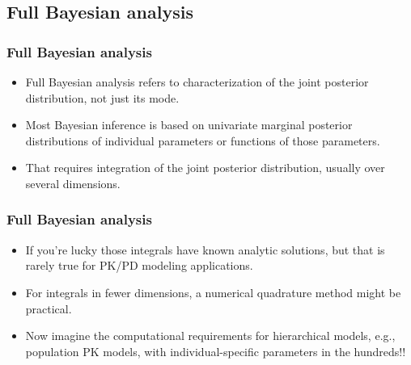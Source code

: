 \documentclass[handout]{beamer}
\begin{document}





\subsection{Full Bayesian analysis}

\begin{frame}
  \frametitle{Full Bayesian analysis}

  \begin{itemize}
\item Full Bayesian analysis refers to characterization of the joint
posterior distribution, not just its mode.
\item Most Bayesian inference is based on univariate marginal
  posterior distributions of individual parameters or functions of
 those parameters.
\item That requires integration of the joint posterior distribution,
  usually over several dimensions.
  \end{itemize}

\end{frame}

\begin{frame}
  \frametitle{Full Bayesian analysis}

  \begin{itemize}
  \item If you're lucky those integrals have known analytic solutions,
    but that is rarely true for PK/PD modeling applications.
  \item For integrals in fewer dimensions, a numerical
    quadrature method might be practical. 
  \item Now imagine the computational requirements for hierarchical
    models, e.g., population PK models, with individual-specific
    parameters in the hundreds!!
  \end{itemize}

\end{frame}
\end{document}
